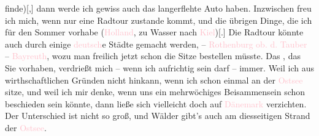                   finde){[},{]} dann werde ich gewiss auch das langerflehte Auto
               haben. Inzwischen freu ich mich, wenn nur eine Radtour zustande kommt, und die
               übrigen Dinge, die ich für den Sommer vorhabe (\textcolor{pink}{Holland}{}\ledrightnote{\textcolor{pink}{Niederlande}}, zu Wasser nach \textcolor{pink}{Kiel}{}\ledrightnote{\textcolor{pink}{Kiel}}){[}.{]} Die Radtour könnte auch durch einige \textcolor{pink}{deutsch}{}\ledrightnote{{$\rightarrow$}\textcolor{pink}{Deutschland}}e Städte gemacht werden,
               – \textcolor{pink}{Rothenburg ob. d. Tauber}{}\ledrightnote{\textcolor{pink}{Rothenburg ob der Tauber}} – \textcolor{pink}{Bayreuth}{}\ledrightnote{\textcolor{pink}{Bayreuth}}, wozu man freilich jetzt schon die Sitze bestellen
               müsste. Das \label{K_L03416-3v}\label{K_L03416-3h}, das Sie vorhaben, verdrießt mich – wenn ich
               aufrichtig sein darf – immer. Weil ich {\dotstwo} aus
               wirthschaftlichen Gründen {\dotstwo} nicht hinkann, wenn ich schon
               einmal an der \textcolor{pink}{Ostsee}{}\ledrightnote{\textcolor{pink}{Ostsee}} sitze, und weil ich mir
               denke, wenn uns ein mehrwöchiges Beisammensein schon beschieden sein könnte, dann
               ließe sich vielleicht doch auf \textcolor{pink}{Dänemark}{}\ledrightnote{\textcolor{pink}{Dänemark}}
               verzichten. Der Unterschied ist nicht so groß, und Wälder gibt's auch am diesseitigen
               Strand der \textcolor{pink}{Ostsee}{}\ledrightnote{\textcolor{pink}{Ostsee}}.\pend
           
